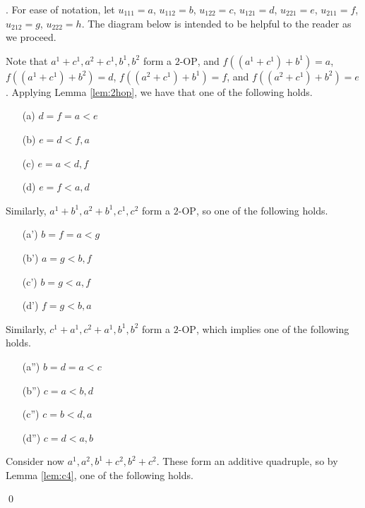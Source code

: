 \documentclass[12pt,oneside,british,a4wide]{amsart}
\numberwithin{equation}{section}
\theoremstyle{definition}
\def\OP{\mathrm{OP}}
\newenvironment{proofof}[1]{\indent{\itshape Proof of #1}.\;}{\qed}
\begin{document}
\begin{proofof}{Lemma \ref{lem:2hop}}
For ease of notation, let $u_{111}=a$, $u_{112}=b$, $u_{122}=c$, $u_{121}=d$, $u_{221}=e$, $u_{211}=f$, $u_{212}=g$, $u_{222}=h$.  The diagram below is intended to be helpful to the reader as we proceed.

\begin{figure}[H]
\end{figure}

Note that $a^1+c^1, a^2+c^1,b^1,b^2$ form a $2$-$\OP$, and $f((a^1+c^1)+b^1)=a$, $f((a^1+c^1)+b^2)=d$, $f((a^2+c^1)+b^1)=f$, and $f((a^2+c^1)+b^2)=e$.   Applying Lemma \ref{lem:2hop}, we have that one of the following holds.
\begin{enumerate}
\item[(a)] $d=f=a<e$
\item[(b)] $e=d<f,a$
\item[(c)] $e=a<d,f$
\item[(d)] $e=f<a,d$
\end{enumerate}
Similarly, $a^1+b^1,a^2+b^1, c^1,c^2$ form a $2$-$\OP$, so one of the following holds.
\begin{enumerate}
\item[(a')] $b=f=a<g$
\item[(b')] $a=g<b,f$
\item[(c')] $b=g<a,f$
\item[(d')] $f=g<b,a$
\end{enumerate}
Similarly, $c^1+a^1,c^2+a^1,b^1,b^2$ form a $2$-$\OP$,  which implies one of the following holds.
\begin{enumerate}
\item[(a'')] $b=d=a<c$
\item[(b'')] $c=a<b,d$
\item[(c'')] $c=b<d,a$
\item[(d'')] $c=d<a,b$
\end{enumerate}
Consider now $a^1,a^2,b^1+c^2,b^2+c^2$.  These form an additive quadruple, so by Lemma \ref{lem:c4}, one of the following holds.


\end{proofof}
\end{document}

